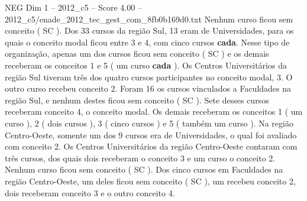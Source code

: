 \begin{textsample}{NEG Dim 1 – 2012\_c5 – Score 4.00 – 2012\_c5/enade\_2012\_tec\_gest\_com\_8fb0b169d0.txt}
Nenhum curso ficou sem conceito ( SC ).
Dos 33 cursos da região Sul, 13 eram de Universidades, para os quais o conceito modal ficou entre 3 e 4, com cinco cursos \textbf{cada}.
Nesse tipo de organização, apenas um dos cursos ficou sem conceito ( SC ) e os demais receberam os conceitos 1 e 5 ( um curso \textbf{cada} ).
Os Centros Universitários da região Sul tiveram três dos quatro cursos participantes no conceito modal, 3.
O outro curso recebeu conceito 2.
Foram 16 os cursos vinculados a Faculdades na região Sul, e nenhum destes ficou sem conceito ( SC ).
Sete desses cursos receberam conceito 4, o conceito modal.
Os demais receberam os conceitos 1 ( um curso ), 2 ( dois cursos ), 3 ( cinco cursos ) e 5 ( também um curso ).
Na região Centro-Oeste, somente um dos 9 cursos era de Universidades, o qual foi avaliado com conceito 2.
Os Centros Universitários da região Centro-Oeste contaram com três cursos, dos quais dois receberam o conceito 3 e um curso o conceito 2.
Nenhum curso ficou sem conceito ( SC ).
Dos cinco cursos em Faculdades na região Centro-Oeste, um deles ficou sem conceito ( SC ), um recebeu conceito 2, dois receberam conceito 3 e o outro conceito 4.

\end{textsample}
